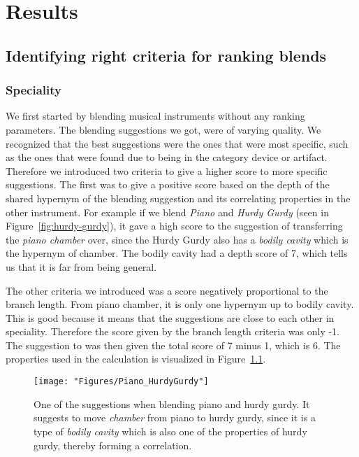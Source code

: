 
\chapter{Results} %

\label{Chapter6} %


\section{Identifying right criteria for ranking blends}

\subsection{Speciality}
We first started by blending musical instruments without any ranking parameters. The blending suggestions we got, were of varying quality. We recognized that the best suggestions were the ones that were most specific, such as the ones that were found due to being in the category device or artifact. Therefore we introduced two criteria to give a higher score to more specific suggestions. The first was to give a positive score based on the depth of the shared hypernym of the blending suggestion and its correlating properties in the other instrument. For example if we blend \emph{Piano} and \emph{Hurdy Gurdy} (seen in Figure~\ref{fig:hurdy-gurdy}), it gave a high score to the suggestion of transferring the \emph{piano chamber} over, since the Hurdy Gurdy also has a \emph{bodily cavity} which is the hypernym of chamber. The bodily cavity had a depth score of 7, which tells us that it is far from being general.

The other criteria we introduced was a score negatively proportional to the branch length. From piano chamber, it is only one hypernym up to bodily cavity. This is good because it means that the suggestions are close to each other in speciality. Therefore the score given by the branch length criteria was only -1. The suggestion to was then given the total score of 7 minus 1, which is 6. The properties used in the calculation is visualized in Figure~\ref{fig:piano-hurdy-gurdy}.


\begin{figure}[h]
	\centering
	\texttt{[image: "Figures/Piano\_HurdyGurdy"]}
	\caption[Blending piano and hurdy gurdy]{One of the suggestions when blending piano and hurdy gurdy. It suggests to move \emph{chamber} from piano to hurdy gurdy, since it is a type of \emph{bodily cavity} which is also one of the properties of hurdy gurdy, thereby forming a correlation.}
	\label{fig:piano-hurdy-gurdy}
\end{figure}

